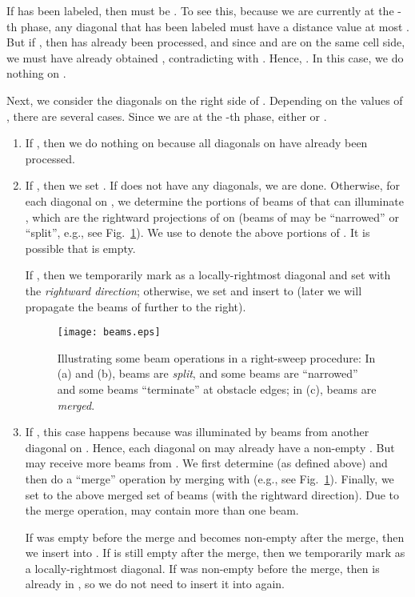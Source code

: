\documentclass[english,runningheads,11pt]{llncs-revised}
\begin{document}
If  has been labeled, then  must be . To see this, because we are currently at the -th phase, any diagonal that has been labeled must have a distance value at most . But if , then  has already been processed, and since  and  are on the same cell side, we must have already obtained , contradicting with . Hence, . In this case, we do nothing on .


Next, we consider the diagonals on
the right side  of . Depending on the values
of , there are several cases. Since we are at the -th
phase, either  or .


\begin{enumerate}
\item
If , then we do nothing on  because all diagonals on  have already
been processed.

\item
If ,
then we set . If  does not have any diagonals,
we are done. Otherwise, for each diagonal
 on , we determine the portions of beams of  that can
illuminate , which are the rightward projections of  on
 (beams of  may be ``narrowed'' or ``split'', e.g., see Fig.~\ref{fig:beams}). We use
 to denote the above portions of . It is
possible that  is empty.

If , then we temporarily mark  as a locally-rightmost diagonal
and set  with the {\em rightward
direction}; otherwise, we set  and insert  to
 (later we will propagate the beams of  further to the
right).


\begin{figure}[t]
\begin{minipage}[t]{\linewidth}
\begin{center}
\texttt{[image: beams.eps]}
\caption{\footnotesize Illustrating some beam operations in a right-sweep procedure: In (a) and (b), beams are {\em split}, and some beams are ``narrowed'' and some beams ``terminate'' at obstacle edges; in (c), beams are {\em merged}.}
\label{fig:beams}
\end{center}
\end{minipage}
\vspace{-0.15in}
\end{figure}


\item
If , this case happens because 
was illuminated by beams from another diagonal  on .
Hence, each diagonal  on
 may already have a non-empty . But  may receive
more beams from . We first determine  (as defined
above) and then
do a ``merge'' operation by merging  with  (e.g., see Fig.~\ref{fig:beams}).
Finally, we set  to the above merged set of beams (with the
rightward direction). Due to the merge operation,
 may contain more than one beam.

If  was empty before the merge and becomes non-empty after the
merge, then we insert  into . If  is still empty after
the merge, then we temporarily mark  as a locally-rightmost diagonal.
If  was non-empty before the merge, then  is already in
, so we do not need to insert it into  again.
\end{enumerate}
\end{document}
